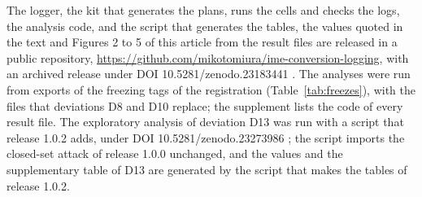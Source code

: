 The logger, the kit that generates the plans, runs the cells and checks the logs, the analysis code, and the script that
generates the tables, the values quoted in the text and Figures 2 to 5 of this article from the result files are
released in a public repository, \url{https://github.com/mikotomiura/ime-conversion-logging}, with an archived release
under DOI 10.5281/zenodo.23183441 \citep{release}. The analyses were run from exports of the freezing tags of the
registration (Table~\ref{tab:freezes}), with the files that deviations D8 and D10 replace; the supplement lists the
code of every result file. The exploratory analysis of deviation D13 was run with a script that release 1.0.2 adds,
under DOI 10.5281/zenodo.23273986 \citep{release102}; the script imports the closed-set attack of release 1.0.0
unchanged, and the values and the supplementary table of D13 are generated by the script that makes the tables of
release 1.0.2.

